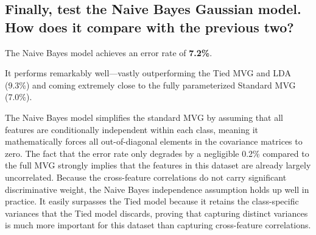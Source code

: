 \subsection*{Finally, test the Naive Bayes Gaussian model. How does it compare with the previous two?}
The Naive Bayes model achieves an error rate of \textbf{7.2\%}. 

It performs remarkably well—vastly outperforming the Tied MVG and LDA (9.3\%) and coming extremely close to the fully parameterized Standard MVG (7.0\%). 

The Naive Bayes model simplifies the standard MVG by assuming that all features are conditionally independent within each class, meaning it mathematically forces all out-of-diagonal elements in the covariance matrices to zero. The fact that the error rate only degrades by a negligible 0.2\% compared to the full MVG strongly implies that the features in this dataset are already largely uncorrelated. Because the cross-feature correlations do not carry significant discriminative weight, the Naive Bayes independence assumption holds up well in practice. It easily surpasses the Tied model because it retains the class-specific variances that the Tied model discards, proving that capturing distinct variances is much more important for this dataset than capturing cross-feature correlations.